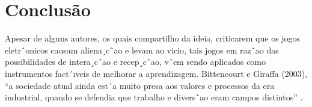 \chapter{Conclusão}\label{ch:Conclusao}


Apesar de alguns autores, os quais compartilho da ideia, criticarem que os jogos eletrˆonicos causam aliena¸c˜ao e levam ao vicio, tais jogos em raz˜ao das possibilidades de intera¸c˜ao e recep¸c˜ao, vˆem sendo aplicados como instrumentos fact´ıveis de melhorar a aprendizagem. %
Bittencourt e Giraffa (2003), “a sociedade atual ainda est´a muito presa aos valores e processos da era industrial, quando se defendia que trabalho e divers˜ao eram campos distintos” .
